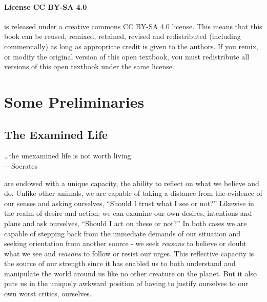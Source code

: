 \documentclass[justified]{tufte-book}
\newenvironment{epigraph}%
{
\begin{flushright}
\begin{minipage}{20em}
\begin{flushright}
\itshape
}%
{
\end{flushright}
\end{minipage}
\end{flushright}
}
\begin{document}
\hypertarget{license-cc-by-sa-4.0}{%
\subsection*{License CC BY-SA 4.0}\label{license-cc-by-sa-4.0}}

 is released under a creative commons \href{https://creativecommons.org/licenses/by-sa/4.0/}{CC BY-SA 4.0} license. This means that this book can be reused, remixed, retained, revised and redistributed (including commercially) as long as appropriate credit is given to the authors. If you remix, or modify the original version of this open textbook, you must redistribute all versions of this open textbook under the same license.

\hypertarget{part-some-preliminaries}{%
\part*{Some Preliminaries}\label{part-some-preliminaries}}

\hypertarget{the-examined-life}{%
\chapter{The Examined Life}\label{the-examined-life}}

\begin{epigraph}
\ldots{}the unexamined life is not worth living.\\
---Socrates
\end{epigraph}

 are endowed with a unique capacity, the ability to reflect on what we believe and do. Unlike other animals, we are capable of taking a distance from the evidence of our senses and asking ourselves, ``Should I trust what I see or not?'' Likewise in the realm of desire and action: we can examine our own desires, intentions and plans and ask ourselves, ``Should I act on these or not?'' In both cases we are capable of stepping back from the immediate demands of our situation and seeking orientation from another source - we seek \emph{reasons} to believe or doubt what we see and \emph{reasons} to follow or resist our urges. This reflective capacity is the source of our strength since it has enabled us to both understand and manipulate the world around us like no other creature on the planet. But it also puts us in the uniquely awkward position of having to justify ourselves to our own worst critics, ourselves.
\end{document}
